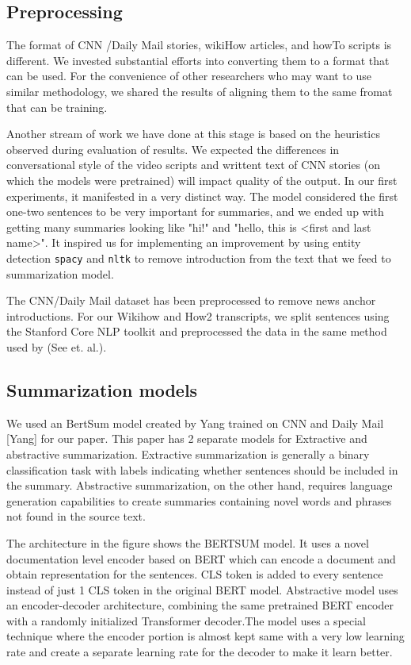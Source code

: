\documentclass{article}
\begin{document}
\subsection{Preprocessing}
\label{Preprocessing}

The format of CNN /Daily Mail stories, wikiHow articles, and howTo scripts is different. We invested substantial efforts into converting them to a format that can be used. For the convenience of other researchers who may want to use similar methodology, we shared the results of aligning them to the same fromat that can be training. 

Another stream of work we have done at this stage is based on the heuristics observed during evaluation of results. We expected the differences in conversational style of the video scripts and writtent text of CNN stories (on which the models were pretrained) will impact quality of the output. In our first experiments, it manifested in a very distinct way. The model considered the first one-two sentences to be very important for summaries, and we ended up with getting many summaries looking like "hi!" and "hello, this is <first and last name>". It inspired us for implementing an improvement by using entity detection   \verb+spacy+ and \verb+nltk+ to remove introduction from the text that we feed to summarization model.  

The CNN/Daily Mail dataset has been preprocessed to remove news anchor introductions. For our Wikihow and How2 transcripts, we  split sentences using the Stanford Core NLP toolkit and preprocessed the data in the same method used by (See et. al.).  


\subsection{Summarization models}

We used an  BertSum model created by Yang trained on CNN and Daily Mail [Yang]  for our paper. This paper has 2 separate models for Extractive and abstractive summarization. Extractive summarization is generally a binary classification task with labels indicating whether sentences should be included in the summary. Abstractive summarization, on the other hand, requires language generation capabilities to create summaries containing novel words and phrases not found in the source text. 

The architecture in the figure shows the BERTSUM model. It uses a novel documentation level encoder based on BERT which can encode a document and obtain representation for the sentences. CLS token is added to every sentence instead of just 1 CLS token in the original BERT model. Abstractive model uses an encoder-decoder architecture, combining the same pretrained BERT encoder with a randomly initialized Transformer decoder.The model uses a special technique where the encoder portion is almost kept same with a very low learning rate and create a separate learning rate for the decoder to make it learn better. 
\end{document}
